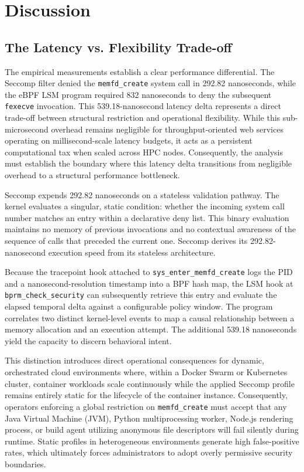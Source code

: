 \section{Discussion}
\label{sec:discussion}


\subsection{The Latency vs. Flexibility Trade-off}
\label{sec:latency_flexibility_tradeoff}

The empirical measurements establish a clear performance differential. The Seccomp filter denied the \texttt{memfd\_create} system call in 292.82 nanoseconds, while the eBPF LSM program required 832 nanoseconds to deny the subsequent \texttt{fexecve} invocation. This 539.18-nanosecond latency delta represents a direct trade-off between structural restriction and operational flexibility. While this sub-microsecond overhead remains negligible for throughput-oriented web services operating on millisecond-scale latency budgets, it acts as a persistent computational tax when scaled across HPC nodes. Consequently, the analysis must establish the boundary where this latency delta transitions from negligible overhead to a structural performance bottleneck.

Seccomp expends 292.82 nanoseconds on a stateless validation pathway. The kernel evaluates a singular, static condition: whether the incoming system call number matches an entry within a declarative deny list. This binary evaluation maintains no memory of previous invocations and no contextual awareness of the sequence of calls that preceded the current one. Seccomp derives its 292.82-nanosecond execution speed from its stateless architecture.

Because the tracepoint hook attached to \texttt{sys\_enter\_memfd\_create} logs the PID and a nanosecond-resolution timestamp into a BPF hash map, the LSM hook at \texttt{bprm\_check\_security} can subsequently retrieve this entry and evaluate the elapsed temporal delta against a configurable policy window. The program correlates two distinct kernel-level events to map a causal relationship between a memory allocation and an execution attempt. The additional 539.18 nanoseconds yield the capacity to discern behavioral intent.

This distinction introduces direct operational consequences for dynamic, orchestrated cloud environments where, within a Docker Swarm or Kubernetes cluster, container workloads scale continuously while the applied Seccomp profile remains entirely static for the lifecycle of the container instance. Consequently, operators enforcing a global restriction on \texttt{memfd\_create} must accept that any Java Virtual Machine (JVM), Python multiprocessing worker, Node.js rendering process, or build agent utilizing anonymous file descriptors will fail silently during runtime. Static profiles in heterogeneous environments generate high false-positive rates, which ultimately forces administrators to adopt overly permissive security boundaries.

